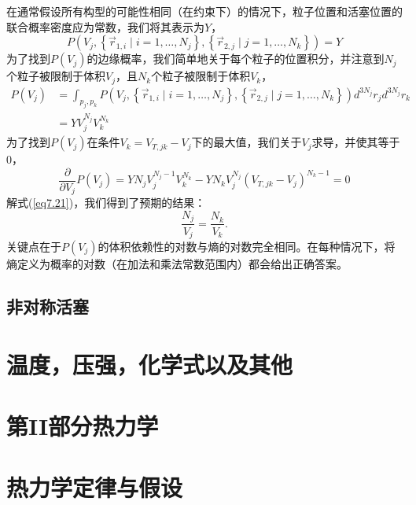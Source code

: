 \documentclass[UTF8]{ctexart}
\numberwithin{equation}{section}%
\numberwithin{figure}{section}%
\begin{document}
    在通常假设所有构型的可能性相同（在约束下）的情况下，粒子位置和活塞位置的联合概率密度应为常数，我们将其表示为$Y$，
    \begin{equation}
        P\left(V_{j},\left\{\vec{r}_{1, i} \mid i=1, \ldots, N_{j}\right\},\left\{\vec{r}_{2, j} \mid j=1, \ldots, N_{k}\right\}\right)=Y
        \end{equation}
    为了找到$P(V_j)$的边缘概率，我们简单地关于每个粒子的位置积分，并注意到$N_j$个粒子被限制于体积$V_j$，且$N_k$个粒子被限制于体积$V_k$，
        \begin{equation}
            \begin{aligned}
            P\left(V_{j}\right) &=\int_{p_{j}, p_{k}} P\left(V_{j},\left\{\vec{r}_{1, i} \mid i=1, \ldots, N_{j}\right\},\left\{\vec{r}_{2, j} \mid j=1, \ldots, N_{k}\right\}\right) d^{3 N_{j}} r_{j} d^{3 N_{j}} r_{k} \\
            &=Y V_{j}^{N_{j}} V_{k}^{N_{k}}
            \end{aligned}
            \end{equation}
    为了找到$P(V_j)$在条件$V_k=V_{T,jk}-V_j$下的最大值，我们关于$V_j$求导，并使其等于$0$，
    \begin{equation}\label{eq7.21}
        \frac{\partial}{\partial V_{j}} P\left(V_{j}\right)=Y N_{j} V_{j}^{N_{j}-1} V_{k}^{N_{k}}-Y N_{k} V_{j}^{N_{j}}\left(V_{T, j k}-V_{j}\right)^{N_{k}-1}=0
        \end{equation}
    解式(\ref{eq7.21})，我们得到了预期的结果：
    \begin{equation}
        \frac{N_{j}}{V_{j}}=\frac{N_{k}}{V_{k}} .
        \end{equation}
    关键点在于$P(V_j)$的体积依赖性的对数与熵的对数完全相同。在每种情况下，将熵定义为概率的对数（在加法和乘法常数范围内）都会给出正确答案。
    \subsection{非对称活塞}
    





    \clearpage
    \section{温度，压强，化学式以及其他}\label{chap8}

    \clearpage
    \section*{第II部分\quad 热力学}
    \label{part2}
    \section{热力学定律与假设}\label{chap9}


    
\end{document}
